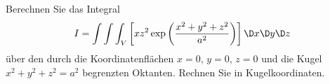 \begin{atiTask}[
  title = Dreifachintegral und Kugelkoordinaten
]
Berechnen Sie das Integral
\[
I=\int \int \int_V\left[xz^2\exp{\left(\frac{x^2+y^2+z^2}{a^2}\right)}\right] \D x\D y\D z
\]
über den durch die Koordinatenflächen $x=0$, $y=0$, $z=0$ und die Kugel $x^2+y^2+z^2=a^2$ begrenzten Oktanten. Rechnen Sie in Kugelkoordinaten.

\end{atiTask}
